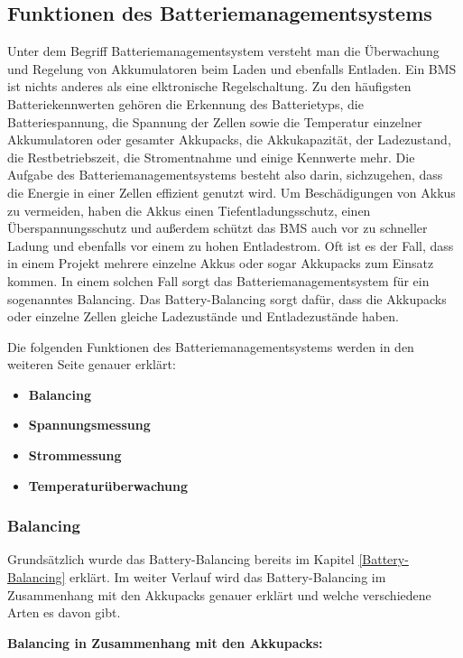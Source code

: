 \subsection{Funktionen des Batteriemanagementsystems}

Unter dem Begriff Batteriemanagementsystem versteht man die Überwachung und Regelung von Akkumulatoren beim Laden und ebenfalls Entladen. Ein BMS ist nichts anderes als eine elktronische Regelschaltung. Zu den häufigsten Batteriekennwerten gehören die Erkennung des Batterietyps, die Batteriespannung, die Spannung der Zellen sowie die Temperatur einzelner Akkumulatoren oder gesamter Akkupacks, die Akkukapazität, der Ladezustand, die Restbetriebszeit, die Stromentnahme und einige Kennwerte mehr. Die Aufgabe des Batteriemanagementsystems besteht also darin, sichzugehen, dass die Energie in einer Zellen effizient genutzt wird. Um Beschädigungen von Akkus zu vermeiden, haben die Akkus einen Tiefentladungsschutz, einen Überspannungsschutz und außerdem schützt das BMS auch vor zu schneller Ladung und ebenfalls vor einem zu hohen Entladestrom. Oft ist es der Fall, dass in einem Projekt mehrere einzelne Akkus oder sogar Akkupacks zum Einsatz kommen. In einem solchen Fall sorgt das Batteriemanagementsystem für ein sogenanntes Balancing. Das Battery-Balancing sorgt dafür, dass die Akkupacks oder einzelne Zellen gleiche Ladezustände und Entladezustände haben. 

Die folgenden Funktionen des Batteriemanagementsystems werden in den weiteren Seite genauer erklärt:

\begin{itemize}
	\item \textbf{Balancing}
	\item \textbf{Spannungsmessung}
	\item \textbf{Strommessung}
	\item \textbf{Temperaturüberwachung}
\end{itemize}


\newpage

\subsubsection{Balancing}

Grundsätzlich wurde das Battery-Balancing bereits im Kapitel \ref{Battery-Balancing} erklärt. Im weiter Verlauf wird das Battery-Balancing im Zusammenhang mit den Akkupacks genauer erklärt und welche verschiedene Arten es davon gibt.


\textbf{Balancing in Zusammenhang mit den Akkupacks:}


